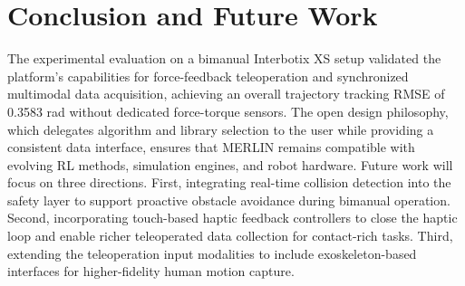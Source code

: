 \documentclass[a4paper, 10pt, conference]{ieeeconf}      %
\begin{document}
\section{Conclusion and Future Work}
The experimental evaluation on a bimanual Interbotix XS setup validated the platform's capabilities for force-feedback teleoperation and synchronized multimodal data acquisition, achieving an overall trajectory tracking RMSE of 0.3583 rad without dedicated force-torque sensors. The open design philosophy, which delegates algorithm and library selection to the user while providing a consistent data interface, ensures that MERLIN remains compatible with evolving RL methods, simulation engines, and robot hardware.
\hspace{1em}Future work will focus on three directions. First, integrating real-time collision detection into the safety layer to support proactive obstacle avoidance during bimanual operation. Second, incorporating touch-based haptic feedback controllers to close the haptic loop and enable richer teleoperated data collection for contact-rich tasks. Third, extending the teleoperation input modalities to include exoskeleton-based interfaces for higher-fidelity human motion capture.




\end{document}
